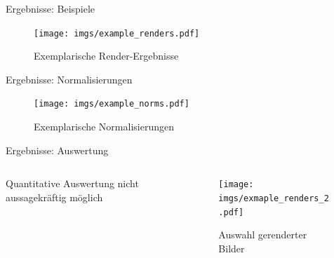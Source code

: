 \begin{frame}{Ergebnisse: Beispiele}
    \begin{figure}
        \centering
        \texttt{[image: imgs/example\_renders.pdf]}
        \caption{Exemplarische Render-Ergebnisse}
    \end{figure}
\end{frame}

\begin{frame}{Ergebnisse: Normalisierungen}
    \begin{figure}
        \centering
        \texttt{[image: imgs/example\_norms.pdf]}
        \caption{Exemplarische Normalisierungen}
    \end{figure}
\end{frame}

\begin{frame}{Ergebnisse: Auswertung}
    \begin{columns}
        \begin{column}{0.7\linewidth}

            Quantitative Auswertung nicht aussagekräftig möglich

            \vspace*{1em}


            \vspace*{1em}


        \end{column}
        \begin{column}{0.3\linewidth}

            \begin{figure}
                \centering
                \texttt{[image: imgs/exmaple\_renders\_2.pdf]}
                \caption{Auswahl gerenderter Bilder}
            \end{figure}

        \end{column}
    \end{columns}
\end{frame}
